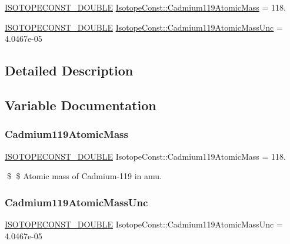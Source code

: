 \begin{DoxyCompactItemize}
\item 
\mbox{\hyperlink{group___isotope_const-_macros_ga8f45a7272ce02c0b4c65c44636ed719a}{I\+S\+O\+T\+O\+P\+E\+C\+O\+N\+S\+T\+\_\+\+D\+O\+U\+B\+LE}} \mbox{\hyperlink{group___isotope_const-_cadmium-_cd119_ga2a5df8a1b0aced9ae27529c1808224a0}{Isotope\+Const\+::\+Cadmium119\+Atomic\+Mass}} = 118.
\item 
\mbox{\hyperlink{group___isotope_const-_macros_ga8f45a7272ce02c0b4c65c44636ed719a}{I\+S\+O\+T\+O\+P\+E\+C\+O\+N\+S\+T\+\_\+\+D\+O\+U\+B\+LE}} \mbox{\hyperlink{group___isotope_const-_cadmium-_cd119_ga7eb2fc0ec81bb5dc614a60f63f839779}{Isotope\+Const\+::\+Cadmium119\+Atomic\+Mass\+Unc}} = 4.\+0467e-\/05
\end{DoxyCompactItemize}


\subsection{Detailed Description}


\subsection{Variable Documentation}
\mbox{\label{group___isotope_const-_cadmium-_cd119_ga2a5df8a1b0aced9ae27529c1808224a0}} 
\subsubsection{\texorpdfstring{Cadmium119\+Atomic\+Mass}{Cadmium119AtomicMass}}
{\footnotesize\ttfamily \mbox{\hyperlink{group___isotope_const-_macros_ga8f45a7272ce02c0b4c65c44636ed719a}{I\+S\+O\+T\+O\+P\+E\+C\+O\+N\+S\+T\+\_\+\+D\+O\+U\+B\+LE}} Isotope\+Const\+::\+Cadmium119\+Atomic\+Mass = 118.}

\$ \$ Atomic mass of Cadmium-\/119 in amu. \mbox{\label{group___isotope_const-_cadmium-_cd119_ga7eb2fc0ec81bb5dc614a60f63f839779}} 
\subsubsection{\texorpdfstring{Cadmium119\+Atomic\+Mass\+Unc}{Cadmium119AtomicMassUnc}}
{\footnotesize\ttfamily \mbox{\hyperlink{group___isotope_const-_macros_ga8f45a7272ce02c0b4c65c44636ed719a}{I\+S\+O\+T\+O\+P\+E\+C\+O\+N\+S\+T\+\_\+\+D\+O\+U\+B\+LE}} Isotope\+Const\+::\+Cadmium119\+Atomic\+Mass\+Unc = 4.\+0467e-\/05}

